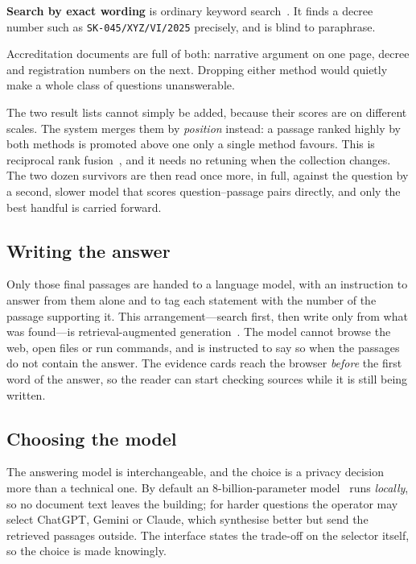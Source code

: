 \documentclass[conference]{IEEEtran}
\begin{document}
\textbf{Search by exact wording} is ordinary keyword search~\cite{bm25}. It
finds a decree number such as \texttt{SK-045/XYZ/VI/2025} precisely, and is
blind to paraphrase.

Accreditation documents are full of both: narrative argument on one page,
decree and registration numbers on the next. Dropping either method would
quietly make a whole class of questions unanswerable.

The two result lists cannot simply be added, because their scores are on
different scales. The system merges them by \emph{position} instead: a passage
ranked highly by both methods is promoted above one only a single method
favours. This is reciprocal rank fusion~\cite{rrf}, and it needs no retuning when
the collection changes. The two dozen survivors are then read once more, in
full, against the question by a second, slower model that scores
question--passage pairs directly, and only the best handful is carried forward.

\subsection{Writing the answer}

Only those final passages are handed to a language model, with an instruction to
answer from them alone and to tag each statement with the number of the passage
supporting it. This arrangement---search first, then write only from what was
found---is retrieval-augmented generation~\cite{lewis}. The model cannot browse
the web, open files or run commands, and is instructed to say so when the
passages do not contain the answer. The evidence cards reach the browser
\emph{before} the first word of the answer, so the reader can start checking
sources while it is still being written.

\subsection{Choosing the model}

The answering model is interchangeable, and the choice is a privacy decision
more than a technical one. By default an 8-billion-parameter model~\cite{qwen}
runs \emph{locally}, so no document text leaves the building; for harder
questions the operator may select ChatGPT, Gemini or Claude, which synthesise
better but send the retrieved passages outside. The interface states the
trade-off on the selector itself, so the choice is made knowingly.
\end{document}
